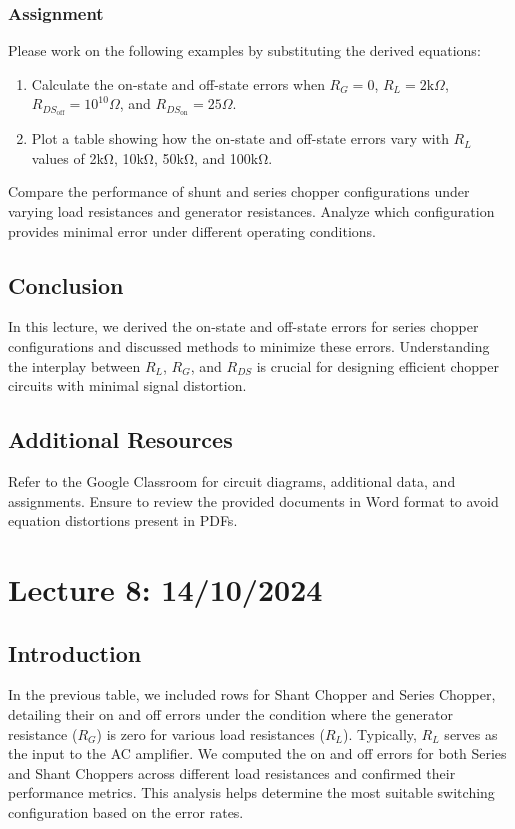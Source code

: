 \subsubsection{Assignment}
Please work on the following examples by substituting the derived equations:
\begin{enumerate}
    \item Calculate the on-state and off-state errors when \( R_G = 0 \), \( R_L = 2\text{k}\Omega \), \( R_{DS_{\text{off}}} = 10^{10}\Omega \), and \( R_{DS_{\text{on}}} = 25\Omega \).
    \item Plot a table showing how the on-state and off-state errors vary with \( R_L \) values of 2kΩ, 10kΩ, 50kΩ, and 100kΩ.
\end{enumerate}

Compare the performance of shunt and series chopper configurations under varying load resistances and generator resistances. Analyze which configuration provides minimal error under different operating conditions.

\subsection{Conclusion}
In this lecture, we derived the on-state and off-state errors for series chopper configurations and discussed methods to minimize these errors. Understanding the interplay between \( R_L \), \( R_G \), and \( R_{DS} \) is crucial for designing efficient chopper circuits with minimal signal distortion.

\subsection{Additional Resources}
Refer to the Google Classroom for circuit diagrams, additional data, and assignments. Ensure to review the provided documents in Word format to avoid equation distortions present in PDFs.
\newpage
\section{Lecture 8: 14/10/2024}

\subsection{Introduction}
In the previous table, we included rows for Shant Chopper and Series Chopper, detailing their on and off errors under the condition where the generator resistance (\( R_G \)) is zero for various load resistances (\( R_L \)). Typically, \( R_L \) serves as the input to the AC amplifier. We computed the on and off errors for both Series and Shant Choppers across different load resistances and confirmed their performance metrics. This analysis helps determine the most suitable switching configuration based on the error rates.

